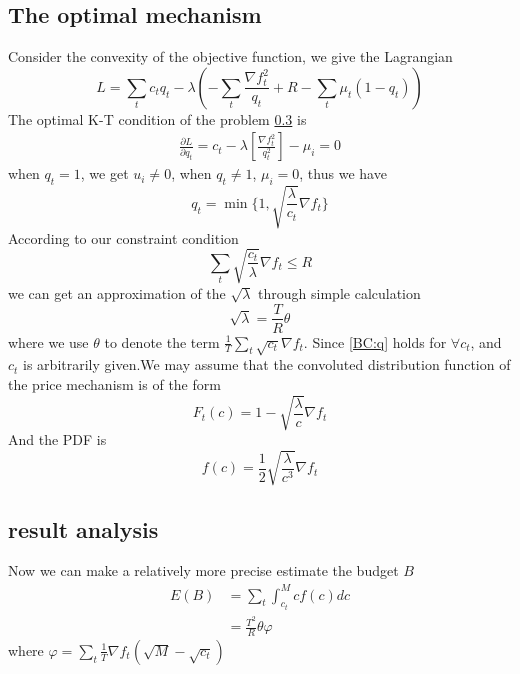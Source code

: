\documentclass[10pt,conference,compsocconf,letterpaper]{IEEEtran}
\begin{document}
\subsection{The optimal mechanism}
Consider the convexity of the objective function, we give the Lagrangian
\begin{equation}
L=\sum_t c_t q_t -\lambda(-\sum_t\frac{\nabla f_t^2}{q_t}+R-\sum_t\mu_t(1-q_t))
\end{equation}
The optimal K-T condition of the problem \ref{} is 
\begin{align}
\frac{\partial L}{\partial q_t}=c_t-\lambda[\frac{\nabla f_t^2}{q_t^2}]-\mu_i=0
\end{align}
when $q_t=1$, we get $u_i\neq 0$, when $q_t\neq 1$, $\mu_i=0$, thus we have
\begin{equation}\label{BC:q}
q_t=\min\{1,\sqrt{\frac{\lambda}{c_t}}\nabla f_t\}
\end{equation}
According to our constraint condition
\begin{equation}
\sum_t \sqrt{\frac{c_t}{\lambda}}\nabla f_t\leq R
\end{equation}
we can get an approximation of the $\sqrt{\lambda}$ through simple calculation
\begin{equation}
\sqrt{\lambda}=\frac{T}{R}\theta
\end{equation}
where we use $\theta$ to denote the term $\frac{1}{T}\sum_t\sqrt{c_t}\nabla f_t$.
Since \ref{BC:q} holds for $\forall c_t$, and $c_t$ is arbitrarily given.We may assume that the convoluted distribution function of the price mechanism is of the form 
\begin{equation}
F_t(c)=1-\sqrt{\frac{\lambda}{c}}\nabla f_t
\end{equation}
And the PDF is 
\begin{equation}
f(c)=\frac{1}{2}\sqrt{\frac{{\lambda}}{c^3}}\nabla f_t
\end{equation}
\subsection{result analysis}
Now we can make a relatively more precise estimate the budget $B$
\begin{align}
E(B)&=\sum_t\int_{c_t}^Mcf(c)dc\\
&=\frac{T^2}{R}\theta\varphi
\end{align}
where $\varphi=\sum_t\frac{1}{T}\nabla f_t(\sqrt{M}-\sqrt{c_t})$
\subsection{}
\end{document}

